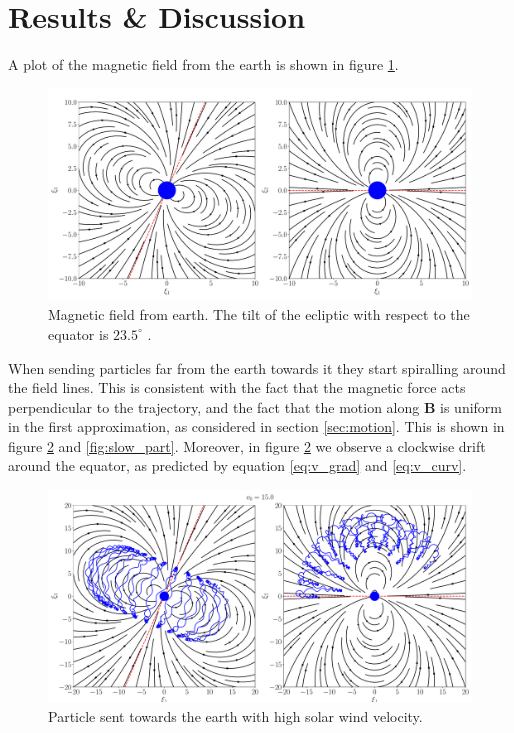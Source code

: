 \section{Results \& Discussion}

A plot of the magnetic field from the earth is shown in figure \ref{fig:earth}.

\begin{figure}[htb]
	\centering
	\includegraphics[width=\columnwidth]{../fig/earth.pdf}
	\caption{Magnetic field from earth. The tilt of the ecliptic with respect to the equator is $23.5^\circ$ \cite{https://doi.org/10.1029/2012JA018056}.}
	\label{fig:earth}
\end{figure}

When sending particles far from the earth towards it they start spiralling around the field lines. This is consistent with the fact that the magnetic force acts perpendicular to the trajectory, and the fact that the motion along $\mathbf{B}$ is uniform in the first approximation, as considered in section \ref{sec:motion}. This is shown in figure \ref{fig:fast_part} and \ref{fig:slow_part}. 
Moreover, in figure \ref{fig:fast_part} we observe a clockwise drift around the equator, as predicted by equation \eqref{eq:v_grad} and \eqref{eq:v_curv}.

\begin{figure}[h!]
	\centering
	\includegraphics[width=\columnwidth]{../fig/earth_traj_fast.pdf}
	\caption{Particle sent towards the earth with high solar wind velocity.}
	\label{fig:fast_part}
\end{figure}

